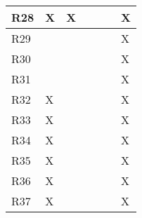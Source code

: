 \begin{table}[]
\begin{tabular}{|l|l|l|l|l|l|l|}
    R28 & X  & X  &    &    &    & X    \\ \hline
    R29 &    &    &    &    &    & X    \\ \hline
    R30 &    &    &    &    &    & X    \\ \hline
    R31 &    &    &    &    &    & X    \\ \hline
    R32 & X  &    &    &    &    & X    \\ \hline
    R33 & X  &    &    &    &    & X    \\ \hline
    R34 & X  &    &    &    &    & X    \\ \hline
    R35 & X  &    &    &    &    & X    \\ \hline
    R36 & X  &    &    &    &    & X    \\ \hline
    R37 & X  &    &    &    &    & X    \\ \hline
    \end{tabular}
    \end{table}